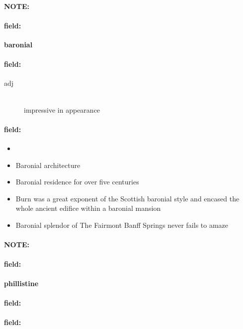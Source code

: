 \documentclass[12pt]{article}
\newenvironment{note}{\paragraph{NOTE:}}{}
\newenvironment{field}{\paragraph{field:}}{}
\begin{document}
\begin{note}
\begin{field}
\textbf{\large baronial}
\end{field}


\begin{field}
\begin{description}
\item[adj] \hfill \\ 
impressive in appearance

\end{description}
\end{field}

\begin{field}
\begin{itemize}
\item 
\item Baronial architecture
\item Baronial residence for over five centuries
\item Burn was a great exponent of the Scottish baronial style and encased the whole ancient edifice within a baronial mansion
\item Baronial splendor of The Fairmont Banff Springs never fails to amaze
\end{itemize}
\end{field}
\end{note}
\begin{note}
\begin{field}
\textbf{\large phillistine}
\end{field}


\begin{field}
\end{field}

\begin{field}
\end{field}
\end{note}
\end{document}

